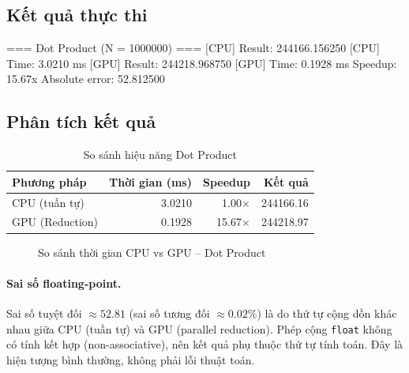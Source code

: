 \documentclass[12pt,a4paper]{article}
\begin{document}
\subsection{Kết quả thực thi}

\begin{outputbox}
=== Dot Product (N = 1000000) ===
[CPU] Result: 244166.156250
[CPU] Time:   3.0210 ms
[GPU] Result: 244218.968750
[GPU] Time:   0.1928 ms
Speedup: 15.67x
Absolute error: 52.812500
\end{outputbox}

\subsection{Phân tích kết quả}

\begin{table}[H]
\centering
\begin{tabular}{lrrr}
\toprule
\textbf{Phương pháp} & \textbf{Thời gian (ms)} & \textbf{Speedup} & \textbf{Kết quả} \\
\midrule
CPU (tuần tự)   & 3.0210 & 1.00$\times$ & 244166.16 \\
GPU (Reduction) & 0.1928 & 15.67$\times$ & 244218.97 \\
\bottomrule
\end{tabular}
\caption{So sánh hiệu năng Dot Product}
\end{table}

\begin{figure}[H]
\centering
{}
\caption{So sánh thời gian CPU vs GPU -- Dot Product}
\end{figure}

\paragraph{Sai số floating-point.}
Sai số tuyệt đối $\approx 52.81$ (sai số tương đối $\approx 0.02\%$) là do thứ tự cộng dồn khác nhau giữa CPU (tuần tự) và GPU (parallel reduction). Phép cộng \texttt{float} không có tính kết hợp (non-associative), nên kết quả phụ thuộc thứ tự tính toán. Đây là hiện tượng bình thường, không phải lỗi thuật toán.
\end{document}
